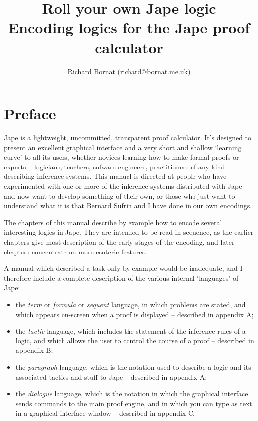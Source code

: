 \documentclass[11pt]{book}
\title{\huge Roll your own Jape logic\\
             Encoding logics for the Jape proof calculator}
\author{Richard Bornat (richard@bornat.me.uk)%
       }
\begin{document}
\maketitle

\chapter*{Preface}

Jape is a lightweight, uncommitted, transparent proof calculator. It's designed to present an excellent graphical interface and a very short and shallow `learning curve' to all its users, whether novices learning how to make formal proofs or experts -- logicians, teachers, sofware engineers, practitioners of any kind -- describing inference systems. This manual is directed at people who have experimented with one or more of the inference systems distributed with Jape and now want to develop something of their own, or those who just want to understand what it is that Bernard Sufrin and I have done in our own encodings.


The chapters of this manual describe by example how to encode several interesting logics in Jape. They are intended to be read in sequence, as the earlier chapters give most description of the early stages of the encoding, and later chapters concentrate on more esoteric features.


A manual which described a task only by example would be inadequate, and I therefore include a complete description of the various internal `languages' of Jape:

\begin{itemize}
\item the \emph{term} or \emph{formula} or \emph{sequent} language, in which problems are stated, and which appears on-screen when a proof is displayed -- described in appendix A;
\item the \emph{tactic} language, which includes the statement of the inference rules of a logic, and which allows the user to control the course of a proof -- described in appendix B;
\item the \emph{paragraph} language, which is the notation used to describe a logic and its associated tactics and stuff to Jape -- described in appendix A;
\item the \emph{dialogue} language, which is the notation in which the graphical interface sends commands to the main proof engine, and in which you can type as text in a graphical interface window -- described in appendix C.
\end{itemize}
\end{document}
